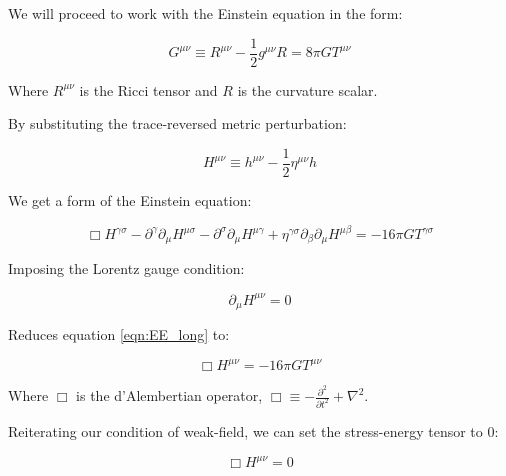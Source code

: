 



We will proceed to work with the Einstein equation in the form:

\begin{equation}
   G^{\mu \nu} \equiv R^{\mu \nu} - \frac{1}{2} g^{\mu \nu} R = 8 \pi G T^{\mu \nu}
   \label{eqn:EFE2}
\end{equation}

Where $R^{\mu \nu}$ is the Ricci tensor and $R$ is the curvature scalar.

By substituting the trace-reversed metric perturbation:

\begin{equation}
   H^{\mu \nu} \equiv h^{\mu \nu} - \frac{1}{2} \eta^{\mu \nu} h
   \label{eqn:bigH}
\end{equation}

We get a form of the Einstein equation:

\begin{equation}
   \Box H^{\gamma \sigma} - \partial^\gamma \partial_\mu H^{\mu \sigma} - \partial^\sigma \partial_\mu H^{\mu \gamma}
   + \eta^{\gamma \sigma} \partial_\beta \partial_\mu H^{\mu \beta} = -16 \pi G T^{\gamma \sigma}
   \label{eqn:EE_long}
\end{equation}

Imposing the Lorentz gauge condition:

\begin{equation}
   \partial_\mu H^{\mu \nu} = 0
   \label{eqn:Lorentz_condition}
\end{equation}

Reduces equation \ref{eqn:EE_long} to:

\begin{equation}
   \Box H^{\mu \nu} = -16 \pi G T^{\mu \nu}
   \label{eqn:simple_EE}
\end{equation}

Where $\Box$ is the d'Alembertian operator, $\Box \equiv -\frac{\partial ^2}{\partial t^2} + \nabla^2$.

Reiterating our condition of weak-field, we can set the stress-energy tensor to 0:

\begin{equation}
   \Box H^{\mu \nu} = 0
   \label{eqn:wave_solutions}
\end{equation}

